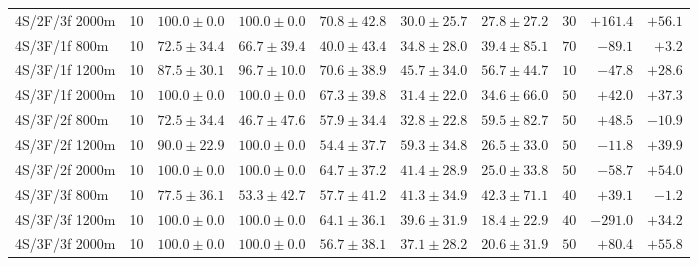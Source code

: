 \begin{tabular}{l r r r r r r r r r}
4S/2F/3f 2000m & 10 & $100.0 \pm 0.0$ & $100.0 \pm 0.0$ & $70.8 \pm 42.8$ & $30.0 \pm 25.7$ & $27.8 \pm 27.2$ & $30$ & $+161.4$ & $+56.1$ \\
4S/3F/1f 800m & 10 & $72.5 \pm 34.4$ & $66.7 \pm 39.4$ & $40.0 \pm 43.4$ & $34.8 \pm 28.0$ & $39.4 \pm 85.1$ & $70$ & $-89.1$ & $+3.2$ \\
4S/3F/1f 1200m & 10 & $87.5 \pm 30.1$ & $96.7 \pm 10.0$ & $70.6 \pm 38.9$ & $45.7 \pm 34.0$ & $56.7 \pm 44.7$ & $10$ & $-47.8$ & $+28.6$ \\
4S/3F/1f 2000m & 10 & $100.0 \pm 0.0$ & $100.0 \pm 0.0$ & $67.3 \pm 39.8$ & $31.4 \pm 22.0$ & $34.6 \pm 66.0$ & $50$ & $+42.0$ & $+37.3$ \\
4S/3F/2f 800m & 10 & $72.5 \pm 34.4$ & $46.7 \pm 47.6$ & $57.9 \pm 34.4$ & $32.8 \pm 22.8$ & $59.5 \pm 82.7$ & $50$ & $+48.5$ & $-10.9$ \\
4S/3F/2f 1200m & 10 & $90.0 \pm 22.9$ & $100.0 \pm 0.0$ & $54.4 \pm 37.7$ & $59.3 \pm 34.8$ & $26.5 \pm 33.0$ & $50$ & $-11.8$ & $+39.9$ \\
4S/3F/2f 2000m & 10 & $100.0 \pm 0.0$ & $100.0 \pm 0.0$ & $64.7 \pm 37.2$ & $41.4 \pm 28.9$ & $25.0 \pm 33.8$ & $50$ & $-58.7$ & $+54.0$ \\
4S/3F/3f 800m & 10 & $77.5 \pm 36.1$ & $53.3 \pm 42.7$ & $57.7 \pm 41.2$ & $41.3 \pm 34.9$ & $42.3 \pm 71.1$ & $40$ & $+39.1$ & $-1.2$ \\
4S/3F/3f 1200m & 10 & $100.0 \pm 0.0$ & $100.0 \pm 0.0$ & $64.1 \pm 36.1$ & $39.6 \pm 31.9$ & $18.4 \pm 22.9$ & $40$ & $-291.0$ & $+34.2$ \\
4S/3F/3f 2000m & 10 & $100.0 \pm 0.0$ & $100.0 \pm 0.0$ & $56.7 \pm 38.1$ & $37.1 \pm 28.2$ & $20.6 \pm 31.9$ & $50$ & $+80.4$ & $+55.8$ \\
\bottomrule
\end{tabular}